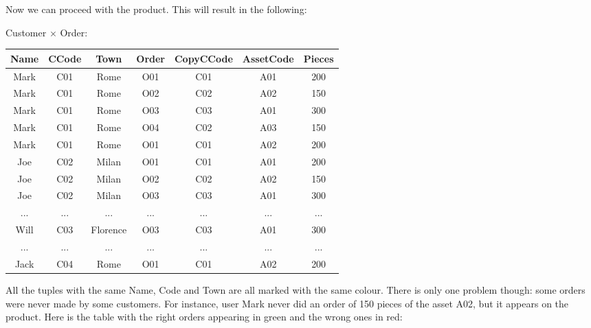 Now we can proceed with the product. This will result in the following:

\begin{center}
    Customer $\times$ Order: \\ \vspace{12pt}
    \begin{tabular}{|c|c|c|c|c|c|c|}
        \hline \rowcolor{maindoccol!60}
        \textbf{Name} & \textbf{CCode} & \textbf{Town} & \textbf{Order} & \textbf{CopyCCode} & \textbf{AssetCode} & \textbf{Pieces} \\
        \hline \rowcolor{green!10}
        Mark & C01 & Rome & O01 & C01 & A01 & 200 \\
        \hline \rowcolor{green!10}
        Mark & C01 & Rome & O02 & C02 & A02 & 150 \\
        \hline \rowcolor{green!10}
        Mark & C01 & Rome & O03 & C03 & A01 & 300 \\
        \hline \rowcolor{green!10}
        Mark & C01 & Rome & O04 & C02 & A03 & 150 \\
        \hline \rowcolor{green!10}
        Mark & C01 & Rome & O01 & C01 & A02 & 200 \\
        \hline \rowcolor{blue!10}
        Joe & C02 & Milan & O01 & C01 & A01 & 200 \\
        \hline \rowcolor{blue!10}
        Joe & C02 & Milan & O02 & C02 & A02 & 150 \\
        \hline \rowcolor{blue!10}
        Joe & C02 & Milan & O03 & C03 & A01 & 300 \\
        \hline
        ... & ... & ... & ... & ... & ... & ... \\
        \hline \rowcolor{yellow!10}
        Will & C03 & Florence & O03 & C03 & A01 & 300 \\
        \hline
        ... & ... & ... & ... & ... & ... & ... \\
        \hline \rowcolor{red!10}
        Jack & C04 & Rome & O01 & C01 & A02 & 200 \\
        \hline
    \end{tabular}
\end{center}

All the tuples with the same Name, Code and Town are all marked with the same colour. There is only one problem though: some orders were never made by some customers. For instance, user Mark never did an order of 150 pieces of the asset A02, but it appears on the product. Here is the table with the right orders appearing in green and the wrong ones in red:

